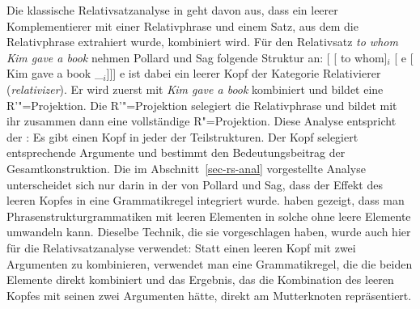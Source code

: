 Die klassische Relativsatzanalyse in  geht davon aus, dass ein leerer
Komplementierer mit einer Relativphrase und einem Satz, aus dem die Relativphrase extrahiert wurde,
kombiniert wird. Für den Relativsatz \emph{to whom Kim gave a book} nehmen Pollard und Sag folgende Struktur an:
\ea
{}[ [ to whom]$_i$ [ e [ Kim gave a book \_$_i$]]]
\z
e ist dabei ein leerer Kopf der Kategorie Relativierer (\emph{relativizer}). Er wird zuerst mit
\emph{Kim gave a book} kombiniert und bildet eine R'"=Projektion. Die R'"=Projektion selegiert die
Relativphrase und bildet mit ihr zusammen dann eine vollständige R"=Projektion. Diese Analyse
entspricht der \xbart: Es gibt einen Kopf in jeder 
der Teilstrukturen. Der Kopf selegiert entsprechende Argumente und bestimmt den Bedeutungsbeitrag
der Gesamtkonstruktion. Die im Abschnitt~\ref{sec-rs-anal} vorgestellte Analyse unterscheidet sich
nur darin in der von Pollard und Sag, dass der Effekt des leeren Kopfes in eine Grammatikregel
integriert wurde. \citet*[, Lemma~4.1]{BHPS61a} haben gezeigt, dass man
Phrasenstrukturgrammatiken mit leeren Elementen in solche ohne leere Elemente umwandeln
kann. Dieselbe Technik, die sie vorgeschlagen haben, wurde auch hier für die Relativsatzanalyse
verwendet: Statt einen leeren Kopf mit zwei Argumenten zu kombinieren, verwendet man eine
Grammatikregel, die die beiden Elemente direkt kombiniert und das Ergebnis, das die Kombination des
leeren Kopfes mit seinen zwei Argumenten hätte, direkt am Mutterknoten repräsentiert.

